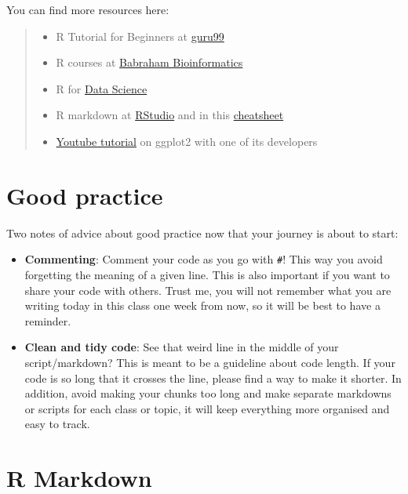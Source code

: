 \documentclass[
]{book}
\providecommand{\tightlist}{%
  \setlength{\itemsep}{0pt}\setlength{\parskip}{0pt}}
\begin{document}
You can find more resources here:

\begin{quote}
\begin{itemize}
\tightlist
\item
  R Tutorial for Beginners at \href{https://www.guru99.com/r-tutorial.html}{guru99}
\item
  R courses at \href{https://www.bioinformatics.babraham.ac.uk/training.html\#advancedrtidy}{Babraham Bioinformatics}
\item
  R for \href{https://r4ds.had.co.nz}{Data Science}
\item
  R markdown at \href{https://rmarkdown.rstudio.com/lesson-1.html}{RStudio} and in this \href{https://www.markdownguide.org/cheat-sheet/}{cheatsheet}
\item
  \href{https://www.youtube.com/watch?v=h29g21z0a68}{Youtube tutorial} on ggplot2 with one of its developers
\end{itemize}
\end{quote}

\hypertarget{good-practice}{%
\section*{Good practice}\label{good-practice}}

Two notes of advice about good practice now that your journey is about to start:

\begin{itemize}
\tightlist
\item
  \textbf{Commenting}: Comment your code as you go with \texttt{\#}! This way you avoid forgetting the meaning of a given line. This is also important if you want to share your code with others. Trust me, you will not remember what you are writing today in this class one week from now, so it will be best to have a reminder.\\
\item
  \textbf{Clean and tidy code}: See that weird line in the middle of your script/markdown? This is meant to be a guideline about code length. If your code is so long that it crosses the line, please find a way to make it shorter. In addition, avoid making your chunks too long and make separate markdowns or scripts for each class or topic, it will keep everything more organised and easy to track.
\end{itemize}

\hypertarget{r-markdown}{%
\section*{R Markdown}\label{r-markdown}}
\end{document}
